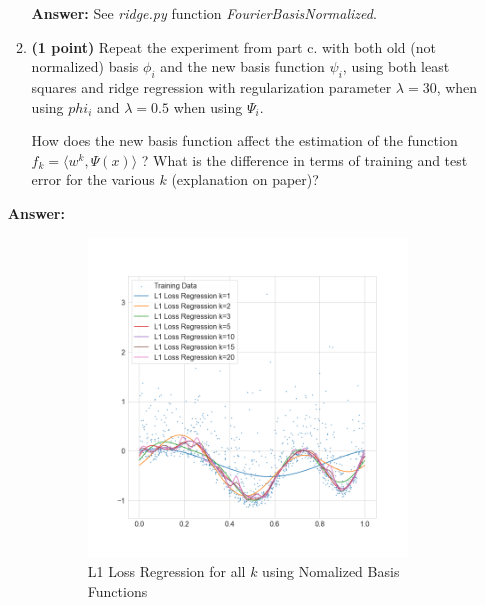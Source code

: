 \documentclass{./tufte-handout}
\begin{document}
\begin{enumerate}[(a)]
\begin{enumerate}
    \textbf{Answer:}
    See \emph{ridge.py} function \emph{ FourierBasisNormalized}.

    \item \textbf{(1 point)} Repeat the experiment from part c. with both old (not normalized) basis 
    $\phi_i$ and the new basis function $\psi_i$, using both least squares and ridge regression 
    with regularization parameter $\lambda = 30$, when using $phi_i$ and $\lambda=0.5$ when using $\Psi_i$. 

    How does the new basis function affect the estimation of the 
    function $f_k = \langle w^k, \Psi(x)\rangle$ ? 
    What is the difference in terms of training and test error 
    for the various $k$ (explanation on paper)?
\end{enumerate}

   \textbf{Answer:}
   \begin{figure}
    \centering
    \begin{subfigure}[b]{.5\textwidth}
        \includegraphics{../figures/normalized_l1_regression_all_k.png}
        \caption{L1 Loss Regression for all $k$ using Nomalized Basis Functions}
    \end{subfigure}%
    \begin{subfigure}[b]{.5\textwidth}

\end{subfigure}
\end{figure}
\end{enumerate}
\end{document}
